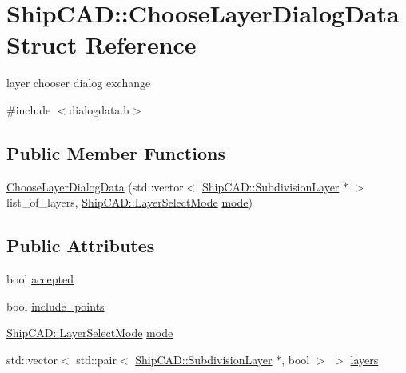 \hypertarget{structShipCAD_1_1ChooseLayerDialogData}{}\section{Ship\+C\+AD\+:\+:Choose\+Layer\+Dialog\+Data Struct Reference}
\label{structShipCAD_1_1ChooseLayerDialogData}


layer chooser dialog exchange  




{\ttfamily \#include $<$dialogdata.\+h$>$}

\subsection*{Public Member Functions}
\begin{DoxyCompactItemize}
\item 
\hyperlink{structShipCAD_1_1ChooseLayerDialogData_a1faf3c871500ab2e85809ddebd3f3342}{Choose\+Layer\+Dialog\+Data} (std\+::vector$<$ \hyperlink{classShipCAD_1_1SubdivisionLayer}{Ship\+C\+A\+D\+::\+Subdivision\+Layer} $\ast$ $>$ list\+\_\+of\+\_\+layers, \hyperlink{namespaceShipCAD_a33e1c54e3609477478431b6a4c106804}{Ship\+C\+A\+D\+::\+Layer\+Select\+Mode} \hyperlink{structShipCAD_1_1ChooseLayerDialogData_a02ef288b4786baafa763a397c6d5dc59}{mode})
\end{DoxyCompactItemize}
\subsection*{Public Attributes}
\begin{DoxyCompactItemize}
\item 
bool \hyperlink{structShipCAD_1_1ChooseLayerDialogData_a96cae0954fbe02423cdaee90c5983da2}{accepted}
\item 
bool \hyperlink{structShipCAD_1_1ChooseLayerDialogData_a24787e5e75c8a507eb02c5152dcf1209}{include\+\_\+points}
\item 
\hyperlink{namespaceShipCAD_a33e1c54e3609477478431b6a4c106804}{Ship\+C\+A\+D\+::\+Layer\+Select\+Mode} \hyperlink{structShipCAD_1_1ChooseLayerDialogData_a02ef288b4786baafa763a397c6d5dc59}{mode}
\item 
std\+::vector$<$ std\+::pair$<$ \hyperlink{classShipCAD_1_1SubdivisionLayer}{Ship\+C\+A\+D\+::\+Subdivision\+Layer} $\ast$, bool $>$ $>$ \hyperlink{structShipCAD_1_1ChooseLayerDialogData_abf3c16e3322c1f9b93822204dd2ee825}{layers}
\end{DoxyCompactItemize}


